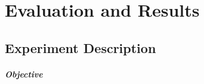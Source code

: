 \documentclass[report.tex]{subfiles}
\begin{document}
    \chapter{Evaluation and Results}

    \section{Experiment Description}

    \paragraph*{Objective}




\end{document}
